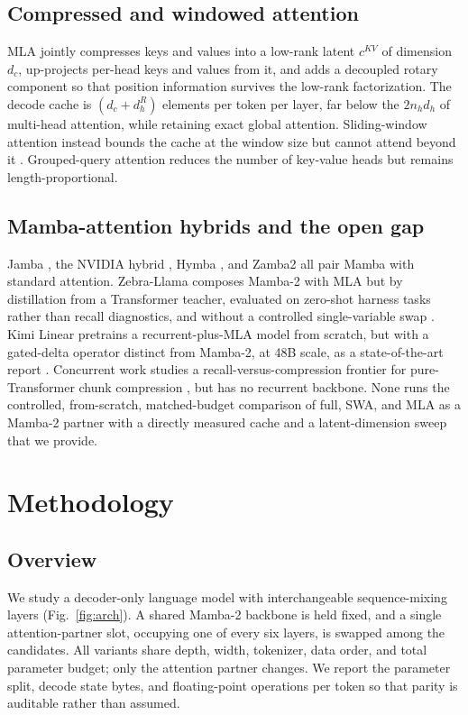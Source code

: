 \documentclass[conference]{IEEEtran}
\begin{document}
\subsection{Compressed and windowed attention}
MLA \cite{deepseekv2,deepseekv3} jointly compresses keys and values into a low-rank latent $c^{KV}$ of dimension $d_c$, up-projects per-head keys and values from it, and adds a decoupled rotary component so that position information survives the low-rank factorization. The decode cache is $(d_c + d_h^R)$ elements per token per layer, far below the $2 n_h d_h$ of multi-head attention, while retaining exact global attention. Sliding-window attention instead bounds the cache at the window size but cannot attend beyond it \cite{samba}. Grouped-query attention reduces the number of key-value heads \cite{gqa} but remains length-proportional.

\subsection{Mamba-attention hybrids and the open gap}
Jamba \cite{jamba}, the NVIDIA hybrid \cite{nvidia}, Hymba \cite{hymba}, and Zamba2 \cite{zamba2} all pair Mamba with standard attention. Zebra-Llama composes Mamba-2 with MLA but by distillation from a Transformer teacher, evaluated on zero-shot harness tasks rather than recall diagnostics, and without a controlled single-variable swap \cite{zebrallama}. Kimi Linear pretrains a recurrent-plus-MLA model from scratch, but with a gated-delta operator distinct from Mamba-2, at 48B scale, as a state-of-the-art report \cite{kimilinear}. Concurrent work studies a recall-versus-compression frontier for pure-Transformer chunk compression \cite{cat}, but has no recurrent backbone. None runs the controlled, from-scratch, matched-budget comparison of full, SWA, and MLA as a Mamba-2 partner with a directly measured cache and a latent-dimension sweep that we provide.

\section{Methodology}
\label{sec:method}

\subsection{Overview}
We study a decoder-only language model with interchangeable sequence-mixing layers (Fig.~\ref{fig:arch}). A shared Mamba-2 backbone is held fixed, and a single attention-partner slot, occupying one of every six layers, is swapped among the candidates. All variants share depth, width, tokenizer, data order, and total parameter budget; only the attention partner changes. We report the parameter split, decode state bytes, and floating-point operations per token so that parity is auditable rather than assumed.
\end{document}
